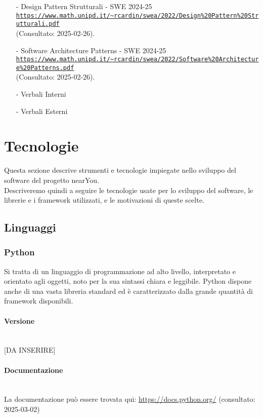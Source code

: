 \documentclass[10pt]{article}
\newcommand{\myparagraph}[1]{\paragraph{#1}\mbox{}\\\vspace{0.4em}}
\begin{document}
\begin{justify}
\begin{itemize}
    \item[-] Design Pattern Strutturali - SWE 2024-25\\
    \textcolor{blue}{\texttt{\url{https://www.math.unipd.it/~rcardin/swea/2022/Design%20Pattern%20Strutturali.pdf}}}\\ (Consultato: 2025-02-26).

    \item[-] Software Architecture Patterns - SWE 2024-25\\
    \textcolor{blue}{\texttt{\url{https://www.math.unipd.it/~rcardin/swea/2022/Software%20Architecture%20Patterns.pdf}}}\\ (Consultato: 2025-02-26).

    \item[-] Verbali Interni
    \item[-] Verbali Esterni
\end{itemize}

\section{Tecnologie}
Questa sezione descrive strumenti e tecnologie impiegate nello sviluppo del software del progetto nearYou.\\
Descriveremo quindi a seguire le tecnologie usate per lo sviluppo del software, le librerie e i framework utilizzati, e le motivazioni di queste scelte.\\

    \subsection{Linguaggi}
        \subsubsection{Python}
            Si tratta di un linguaggio di programmazione ad alto livello, interpretato e orientato agli oggetti, noto per la sua sintassi chiara e leggibile. Python dispone
            anche di una vasta libreria standard ed è caratterizzato dalla grande quantità di framework disponibili.\\
            \myparagraph{Versione}
                [DA INSERIRE]
            \myparagraph{Documentazione}
                     La documentazione può essere trovata qui: \url{https://docs.python.org/} (consultato: 2025-03-02)

\end{justify}
\end{document}
